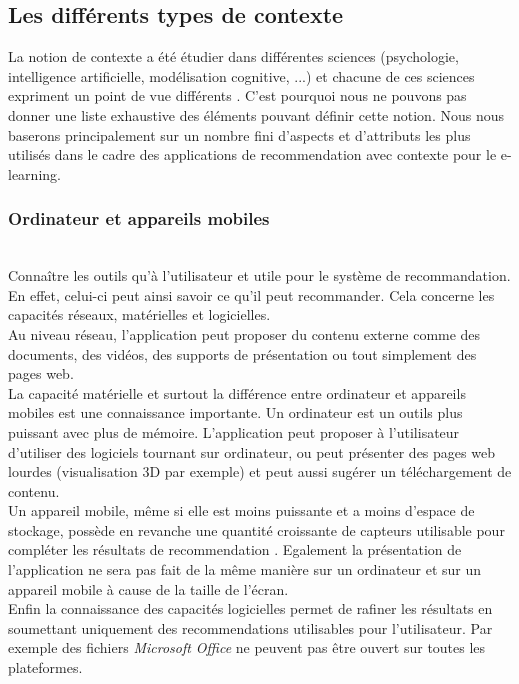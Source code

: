 \documentclass[conference]{./sty/IEEEtran}
\begin{document}
\subsection{Les différents types de contexte}

La notion de contexte a été étudier dans différentes sciences (psychologie,
intelligence artificielle, modélisation cognitive, ...) et chacune de ces
sciences expriment un point de vue différents
\cite{DBLP:reference/rsh/AdomaviciusT11}. C'est pourquoi nous ne pouvons pas
donner une liste exhaustive des éléments pouvant définir cette notion. Nous
nous baserons principalement sur un nombre fini d'aspects et d'attributs les
plus utilisés dans le cadre des applications de recommendation avec contexte
pour le e-learning. \\

\subsubsection{Ordinateur et appareils mobiles}
~\\
Connaître les outils qu'à l'utilisateur et utile pour le système de
recommandation. En effet, celui-ci peut ainsi savoir ce qu'il peut recommander.
Cela concerne les capacités réseaux, matérielles et logicielles. \\

Au niveau réseau, l'application peut proposer du contenu externe comme des
documents, des vidéos, des supports de présentation ou tout simplement des
pages web. \\

La capacité matérielle et surtout la différence entre ordinateur et appareils
mobiles est une connaissance importante. Un ordinateur est un outils plus
puissant avec plus de mémoire. L'application peut proposer à l'utilisateur
d'utiliser des logiciels tournant sur ordinateur, ou peut présenter des pages
web lourdes (visualisation 3D par exemple) et peut aussi sugérer un
téléchargement de contenu. \\
Un appareil mobile, même si elle est moins puissante et a moins d'espace de
stockage, possède en revanche une quantité croissante de capteurs utilisable
pour compléter les résultats de recommendation \cite{DBLP:conf/wstst/Kurti08}.
Egalement la présentation de l'application ne sera pas fait de la même manière
sur un ordinateur et sur un appareil mobile à cause de la taille de l'écran. \\

Enfin la connaissance des capacités logicielles permet de rafiner les résultats
en soumettant uniquement des recommendations utilisables pour l'utilisateur.
Par exemple des fichiers \emph{Microsoft Office} ne peuvent pas être ouvert sur
toutes les plateformes. \\
\end{document}
